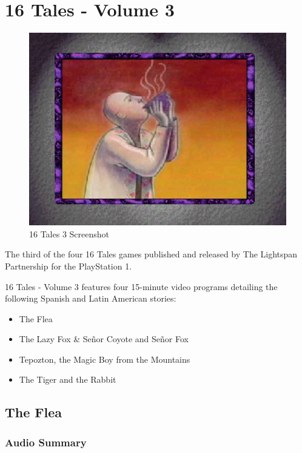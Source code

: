 \chapter{16 Tales - Volume 3}

\begin{figure}[H]
    \centering
    \includegraphics[width=\textwidth/2]{"./Games/16Tales/Images/16Tales3Screenshot.png"}
    \caption{16 Tales 3 Screenshot}
\end{figure}

The third of the four 16 Tales games published and released by The Lightspan Partnership for the PlayStation 1.

16 Tales - Volume 3 features four 15-minute video programs detailing the following Spanish and Latin American stories:

\begin{itemize}
    \item The Flea
    \item The Lazy Fox \& Señor Coyote and Señor Fox
    \item Tepozton, the Magic Boy from the Mountains
    \item The Tiger and the Rabbit
\end{itemize}

\clearpage
\newpage

\section{The Flea}

\subsection{Audio Summary}

